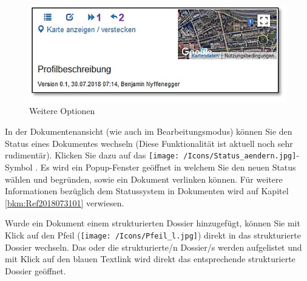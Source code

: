 \begin{figure} 
  \vspace{-25pt} 
  \begin{center}
    \includegraphics[width=1\linewidth]{../chapters/11_Dokumentenablage/pictures/dok_weitereOptionen.jpg}
  \end{center}
  \vspace{-20pt}
  \caption{Weitere Optionen}
  \vspace{-10pt}
\end{figure}

In der Dokumentenansicht (wie auch im Bearbeitungsmodus) können Sie den Status eines Dokumentes wechseln (Diese Funktionalität ist aktuell noch sehr rudimentär). Klicken Sie dazu auf das \texttt{[image: /Icons/Status\_aendern.jpg]}-Symbol . Es wird ein Popup-Fenster geöffnet in welchem Sie den neuen Status wählen und begründen, sowie ein Dokument verlinken können. Für weitere Informationen bezüglich dem Statussystem in Dokumenten wird auf Kapitel \ref{bkm:Ref2018073101} verwiesen.

\vspace{\baselineskip}

Wurde ein Dokument einem strukturierten Dossier hinzugefügt, können Sie mit Klick auf den Pfeil (\texttt{[image: /Icons/Pfeil\_l.jpg]})  direkt in das strukturierte Dossier wechseln. Das oder die strukturierte/n Dossier/s werden aufgelistet und mit Klick auf den blauen Textlink  wird direkt das entsprechende strukturierte Dossier geöffnet.

\begin{figure}[H]
\end{figure}

